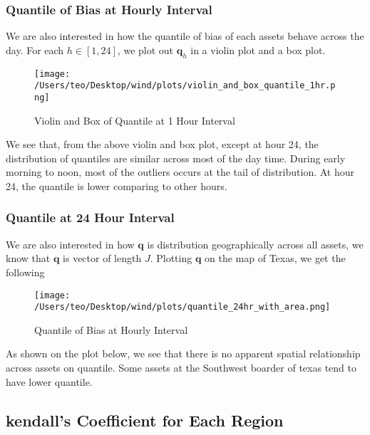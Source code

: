 \documentclass[
]{article}
\begin{document}
\hypertarget{quantile-of-bias-at-hourly-interval}{%
\subsubsection{Quantile of Bias at Hourly
Interval}\label{quantile-of-bias-at-hourly-interval}}

We are also interested in how the quantile of bias of each assets behave
across the day. For each \(h \in [1,24]\), we plot out \(\mathbf{q}_h\)
in a violin plot and a box plot.

\begin{figure}
\centering
\texttt{[image: /Users/teo/Desktop/wind/plots/violin\_and\_box\_quantile\_1hr.png]}
\caption{Violin and Box of Quantile at 1 Hour Interval}
\end{figure}

We see that, from the above violin and box plot, except at hour 24, the
distribution of quantiles are similar across most of the day time.
During early morning to noon, most of the outliers occurs at the tail of
distribution. At hour 24, the quantile is lower comparing to other
hours.

\hypertarget{quantile-at-24-hour-interval}{%
\subsubsection{Quantile at 24 Hour
Interval}\label{quantile-at-24-hour-interval}}

We are also interested in how \(\mathbf{q}\) is distribution
geographically across all assets, we know that \(\mathbf{q}\) is vector
of length \(J\). Plotting \(\mathbf{q}\) on the map of Texas, we get the
following

\begin{figure}
\centering
\texttt{[image: /Users/teo/Desktop/wind/plots/quantile\_24hr\_with\_area.png]}
\caption{Quantile of Bias at Hourly
Interval}
\end{figure}

As shown on the plot below, we see that there is no apparent
spatial relationship across assets on quantile. Some assets at the
Southwest boarder of texas tend to have lower quantile.

\hypertarget{kendalls-coefficient-for-each-region}{%
\subsection{kendall's Coefficient for Each
Region}\label{kendalls-coefficient-for-each-region}}
\end{document}
